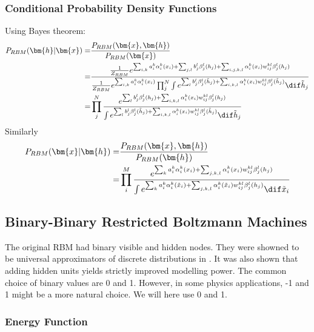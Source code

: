 \subsubsection{Conditional Probability Density Functions}
Using Bayes theorem:
\begin{align}
	P_{RBM} (\bm{h}|\bm{x}) =& \frac{P_{RBM} (\bm{x}, \bm{h})}{P_{RBM} (\bm{x})} \nonumber \\
	=& \frac{\frac{1}{Z_{RBM}} e^{\sum_{i, k} a_i^k \alpha_i^k (x_i)
	+ \sum_{j, l} b_j^l \beta_j^l (h_j) 
	+ \sum_{i,j,k,l} \alpha_i^k (x_i) w_{ij}^{kl} \beta_j^l (h_j)}}
	{\frac{1}{Z_{RBM}} e^{\sum_{i, k} a_i^k \alpha_i^k (x_i)}
	\prod_j^N \int e^{\sum_l b_j^l \beta_j^l (\tilde{h}_j) + \sum_{i,k,l} \alpha_i^k (x_i) w_{ij}^{kl} \beta_j^l (\tilde{h}_j)}  \dif \tilde{h}_j} \nonumber \\
	=& \prod_j^N \frac{e^{\sum_l b_j^l \beta_j^l (h_j) + \sum_{i,k,l} \alpha_i^k (x_i) w_{ij}^{kl} \beta_j^l (h_j)} }
	{\int e^{\sum_l b_j^l \beta_j^l (\tilde{h}_j) + \sum_{i,k,l} \alpha_i^k (x_i) w_{ij}^{kl} \beta_j^l (\tilde{h}_j)}  \dif \tilde{h}_j}
\end{align}
Similarly
\begin{align}
	P_{RBM} (\bm{x}|\bm{h}) =&  \frac{P_{RBM} (\bm{x}, \bm{h})}{P_{RBM} (\bm{h})} \nonumber \\
	=& \prod_i^M \frac{e^{\sum_k a_i^k \alpha_i^k (x_i)
	+ \sum_{j,k,l} \alpha_i^k (x_i) w_{ij}^{kl} \beta_j^l (h_j)}}
	{\int e^{\sum_k a_i^k \alpha_i^k (\tilde{x}_i)
	+ \sum_{j,k,l} \alpha_i^k (\tilde{x}_i) w_{ij}^{kl} \beta_j^l (h_j)} \dif \tilde{x}_i}
\end{align}




\subsection{Binary-Binary Restricted Boltzmann Machines}

The original RBM had binary visible and hidden nodes. They were
showned to be universal approximators of discrete distributions in
\cite{LeRoux2008}. It was also shown that adding hidden units yields
strictly improved modelling power. The common choice of binary values
are 0 and 1. However, in some physics applications, -1 and 1 might be
a more natural choice. We will here use 0 and 1.


\subsubsection{Energy Function}

